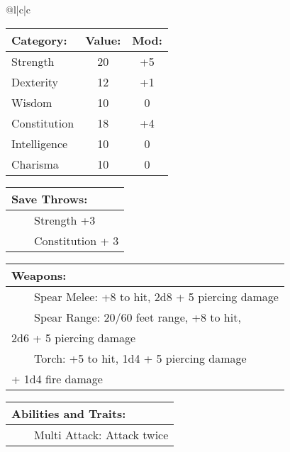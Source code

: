\documentclass[11pt]{article}
\newcommand{\tabitem}{~~\llap{--}~~}
\begin{document}
\begin{multicols}{2}
\noindent \begin{tabularx}{\linewidth}{@{}l|c|c}
 \\
\hline
		\end{tabularx}
\noindent \begin{tabular}{@{}l|c|c}
\textbf{Category:} 			& \textbf{Value:} 	& \textbf{Mod:} \\
\hline
Strength 					& 20				& +5		\\
Dexterity 					& 12 				& +1		\\
Wisdom 						& 10				& 0			\\
Constitution 				& 18 				& +4		\\
Intelligence 				& 10		 		& 0			\\
Charisma 					& 10		 		& 0
		\end{tabular}

\vspace{4mm}

\noindent \begin{tabularx}{\linewidth}{@{}l}
{\Large \textbf{Save Throws:}} \\
\hline
\tabitem Strength +3 \\
\tabitem Constitution + 3
		\end{tabularx}

\vspace{4mm}

\noindent \begin{tabularx}{\linewidth}{@{}l}
{\Large \textbf{Weapons:}} \\
\hline
\tabitem Spear Melee: +8 to hit, 2d8 + 5 piercing damage \\
\tabitem Spear Range: 20/60 feet range, +8 to hit, \\
2d6 + 5 piercing damage \\
\tabitem Torch: +5 to hit, 1d4 + 5 piercing damage \\
+ 1d4 fire damage
		\end{tabularx}

\vspace{4mm}

\noindent \begin{tabularx}{\linewidth}{@{}l}
{\Large \textbf{Abilities and Traits:}} \\
\hline
\tabitem Multi Attack: Attack twice
		\end{tabularx}
	\end{multicols}
\end{document}
